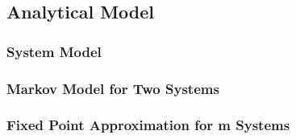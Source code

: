 \subsection{Analytical Model}\label{sec:network:performance_model:analytical_model}

\subsubsection*{System Model}\label{sec:network:performance_model:analytical_model:system_model}


\subsubsection*{Markov Model for Two Systems}\label{sec:network:performance_model:analytical_model:m_systems}

\subsubsection*{Fixed Point Approximation for m Systems}\label{sec:network:performance_model:analytical_model:m_systems}
